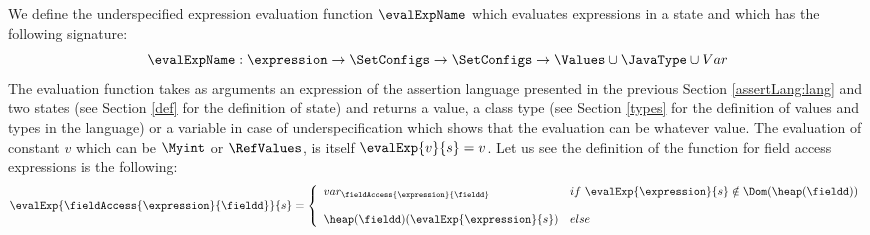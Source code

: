 %
%                                                     
%                                          
%                                       

 
We define the underspecified expression evaluation function 
 $\evalExpName$ which evaluates expressions in a state and which has the following signature:
$$
\evalExpName : \expression \rightarrow \SetConfigs  \rightarrow \SetConfigs    \rightarrow \Values \cup \JavaType \cup Var
$$
The evaluation function  takes as arguments an expression of the assertion language presented in the previous Section 
\ref{assertLang:lang} and two states (see Section \ref{def} for the definition of state)  and returns a value, a class type
(see Section \ref{types} for the definition of values and types in the language) or a variable in case of underspecification 
which shows that the evaluation can be whatever value. 
The evaluation of constant $v$ which can be $\Myint$   or  $\RefValues$, is itself $\evalExp{ v  }{s } = v $.
Let us see the definition of the function for 
field access expressions is the following:
$$
  \evalExp{\fieldAccess{\expression}{\fieldd  }  }{s}  =  
 \left\{\begin{array}{ll}
   var_{\scriptsize{ \fieldAccess{\expression}{\fieldd  }}  }         & if \  \evalExp{ \expression}{ s }  \notin \Dom(\heap(\fieldd)) \\
                                                        & \\
  \heap(\fieldd) (\evalExp{ \expression}{ s } )         & else
\end{array}\right.$$

